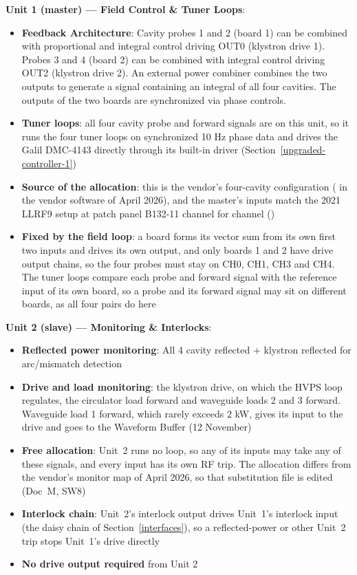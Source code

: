 {\textbf{Unit 1 (master) --- Field Control \& Tuner Loops}:

\begin{itemize}
\tightlist
\item
  \textbf{Feedback Architecture}: Cavity probes 1 and 2 (board 1) can be combined with proportional and integral control driving OUT0 (klystron drive 1). Probes 3 and 4 (board 2) can be combined with integral control driving OUT2 (klystron drive 2). An external power combiner combines the two outputs to generate a signal containing an integral of all four cavities. The outputs of the two boards are synchronized via phase controls.
\item
  \textbf{Tuner loops}: all four cavity probe and forward signals are on this unit, so it runs the four tuner loops on synchronized 10 Hz phase data and drives the Galil DMC-4143 directly through its built-in driver (Section~\ref{upgraded-controller-1})
\item
  \textbf{Source of the allocation}: this is the vendor's four-cavity configuration ( in the vendor software of April 2026), and the master's inputs match the 2021 LLRF9 setup at patch panel B132-11 channel for channel ()
\item
  \textbf{Fixed by the field loop}: a board forms its vector sum from its own first two inputs and drives its own output, and only boards 1 and 2 have drive output chains, so the four probes must stay on CH0, CH1, CH3 and CH4. The tuner loops compare each probe and forward signal with the reference input of its own board, so a probe and its forward signal may sit on different boards, as all four pairs do here
\end{itemize}

\textbf{Unit 2 (slave) --- Monitoring \& Interlocks}:

\begin{itemize}
\tightlist
\item
  \textbf{Reflected power monitoring}: All 4 cavity reflected + klystron reflected for arc/mismatch detection
\item
  \textbf{Drive and load monitoring}: the klystron drive, on which the HVPS loop regulates, the circulator load forward and waveguide loads 2 and 3 forward. Waveguide load 1 forward, which rarely exceeds 2 kW, gives its input to the drive and goes to the Waveform Buffer (12 November)
\item
  \textbf{Free allocation}: Unit~2 runs no loop, so any of its inputs may take any of these signals, and every input has its own RF trip. The allocation differs from the vendor's monitor map of April 2026, so that substitution file is edited (Doc~M, SW8)
\item
  \textbf{Interlock chain}: Unit~2's interlock output drives Unit~1's interlock input (the daisy chain of Section~\ref{interfaces}), so a reflected-power or other Unit~2 trip stops Unit~1's drive directly
\item
  \textbf{No drive output required} from Unit 2
\end{itemize}

}
